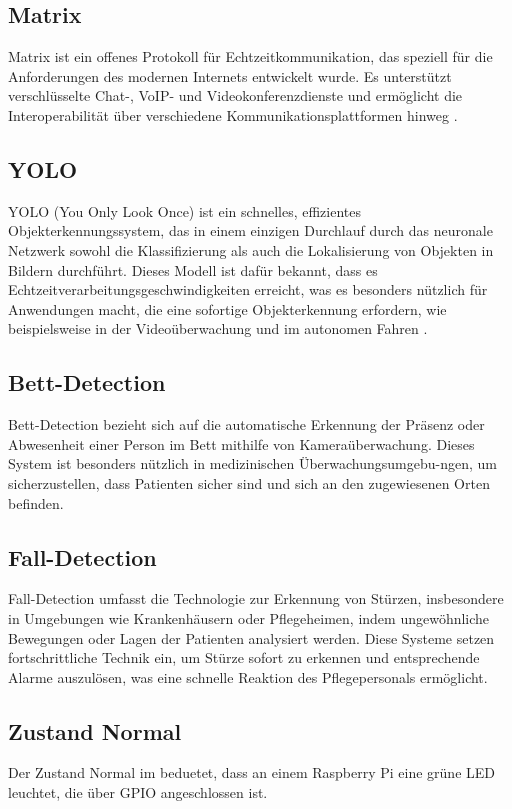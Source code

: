 \subsection{Matrix}
\label{subsec:matrix}
Matrix ist ein offenes Protokoll für Echtzeitkommunikation, das speziell für die Anforderungen des modernen Internets entwickelt wurde. Es unterstützt verschlüsselte Chat-, VoIP- und Videokonferenzdienste und ermöglicht die Interoperabilität über verschiedene Kommunikationsplattformen hinweg \cite{Matrix}.

\subsection{YOLO}
\label{subsec:yolo}
YOLO (You Only Look Once) ist ein schnelles, effizientes Objekterkennungssystem, das in einem einzigen Durchlauf durch das neuronale Netzwerk sowohl die Klassifizierung als auch die Lokalisierung von Objekten in Bildern durchführt. Dieses Modell ist dafür bekannt, dass es Echtzeitverarbeitungsgeschwindigkeiten erreicht, was es besonders nützlich für Anwendungen macht, die eine sofortige Objekterkennung erfordern, wie beispielsweise in der Videoüberwachung und im autonomen Fahren \Cite{Yolo}. 

\subsection{Bett-Detection}
\label{subsec:beddetection}
Bett-Detection bezieht sich auf die automatische Erkennung der Präsenz oder Abwesenheit einer Person im Bett mithilfe von Kameraüberwachung. Dieses System ist besonders nützlich in medizinischen Überwachungsumgebu-ngen, um sicherzustellen, dass Patienten sicher sind und sich an den zugewiesenen Orten befinden.

\subsection{Fall-Detection}
\label{subsec:falldetection}
Fall-Detection umfasst die Technologie zur Erkennung von Stürzen, insbesondere in Umgebungen wie Krankenhäusern oder Pflegeheimen, indem ungewöhnliche Bewegungen oder Lagen der Patienten analysiert werden. Diese Systeme setzen fortschrittliche Technik ein, um Stürze sofort zu erkennen und entsprechende Alarme auszulösen, was eine schnelle Reaktion des Pflegepersonals ermöglicht.

\subsection{Zustand Normal }
\label{subsec:normal}
Der Zustand Normal im beduetet, dass an einem Raspberry Pi eine grüne LED leuchtet, die über GPIO angeschlossen ist. 


